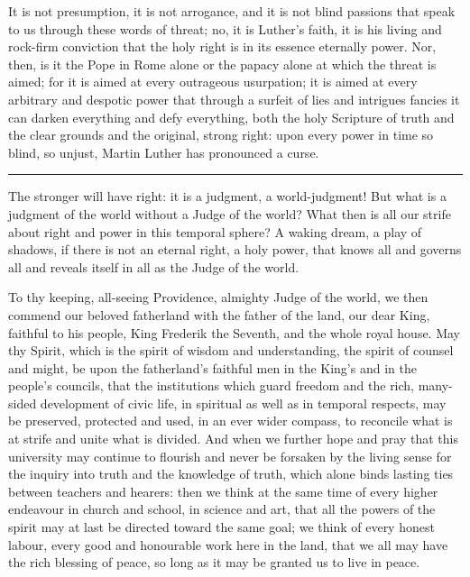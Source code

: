 \documentclass[12pt,a4paper,openany]{book}
\newcommand{\opage}[1]{\marginnote{\footnotesize\textit{[#1]}}}
\begin{document}
It is not presumption, it is not arrogance, and it is
not blind passions that speak to us through these words of
threat; no, it is Luther's faith, it is his living and rock-firm
conviction that the holy right is in its essence eternally
power. Nor, then, is it the Pope in Rome alone or
the papacy alone at which the threat is aimed; for it is aimed
at every outrageous usurpation; it is aimed at every
arbitrary and despotic power that through a surfeit of lies
and intrigues fancies it can darken everything and defy
everything, both the holy Scripture of truth and the clear grounds and
the original, strong right: upon every power in time so blind, so unjust,
Martin Luther has pronounced a curse.

\begin{center}\rule{3em}{0.4pt}\end{center}

The stronger will have right: it is a judgment, a world-judgment!
But what is a judgment of the world without a Judge of the
world? What then is all our strife about right and power in
this temporal sphere? A waking dream, a play of shadows, if there
is not an eternal right, a holy power, that knows all and
governs all and reveals itself in all as the Judge of the world.

To thy keeping, all-seeing Providence, almighty Judge of the
world, we then commend our beloved fatherland with the father of the land,
our dear King, faithful to his people, King Frederik
the Seventh, and the whole royal house. May thy Spirit, which
is the spirit of wisdom and understanding, the spirit of counsel and might,
be upon the fatherland's faithful men in the King's and in the people's
councils, that the institutions which guard freedom and the
rich, many-sided development of civic life, in spiritual as well as
\opage{15}in temporal respects, may be preserved, protected and used, in
an ever wider compass, to reconcile what is at strife and unite what is
divided. And when we further hope and pray that this university
may continue to flourish and never be forsaken by the
living sense for the inquiry into truth and the knowledge of truth,
which alone binds lasting ties between teachers and
hearers: then we think at the same time of every higher
endeavour in church and school, in science and art, that all
the powers of the spirit may at last be directed toward the same goal; we
think of every honest labour, every good and honourable work
here in the land, that we all may have the rich blessing of peace,
so long as it may be granted us to live in peace.
\end{document}
